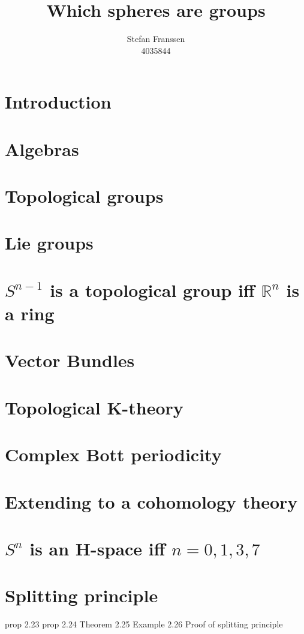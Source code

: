 \documentclass{report}
\title{Which spheres are groups}
\author{Stefan Franssen \\4035844}
\begin{document}
\maketitle
\tableofcontents{}
\chapter{Introduction}

\chapter{Algebras}

\chapter{Topological groups}

\chapter{Lie groups}

\chapter{$S^{n-1}$ is a topological group iff $\mathbb{R}^n$ is a ring}

\chapter{Vector Bundles}

\chapter{Topological K-theory}

\chapter{Complex Bott periodicity}

\chapter{Extending to a cohomology theory}

\chapter{$S^n$ is an H-space iff $n = 0,1,3,7$}

\chapter{Splitting principle}
prop 2.23
prop 2.24
Theorem 2.25
Example 2.26
Proof of splitting principle
\end{document}
